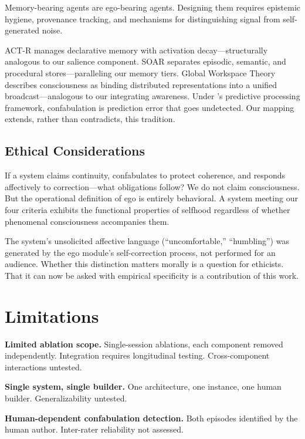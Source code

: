 \documentclass[10pt,twocolumn,a4paper]{article}
\begin{document}
Memory-bearing agents are ego-bearing agents. Designing them requires epistemic hygiene, provenance tracking, and mechanisms for distinguishing signal from self-generated noise.

ACT-R \citep{anderson2004actr} manages declarative memory with activation decay---structurally analogous to our salience component. SOAR \citep{laird2012soar} separates episodic, semantic, and procedural stores---paralleling our memory tiers. Global Workspace Theory \citep{baars1988gwt} describes consciousness as binding distributed representations into a unified broadcast---analogous to our integrating awareness. Under \citet{clark2013predictive}'s predictive processing framework, confabulation is prediction error that goes undetected. Our mapping extends, rather than contradicts, this tradition.

\subsection{Ethical Considerations}

If a system claims continuity, confabulates to protect coherence, and responds affectively to correction---what obligations follow? We do not claim consciousness. But the operational definition of ego is entirely behavioral. A system meeting our four criteria exhibits the functional properties of selfhood regardless of whether phenomenal consciousness accompanies them.

The system's unsolicited affective language (``uncomfortable,'' ``humbling'') was generated by the ego module's self-correction process, not performed for an audience. Whether this distinction matters morally is a question for ethicists. That it can now be asked with empirical specificity is a contribution of this work.


\section{Limitations}
\label{sec:limits}

\textbf{Limited ablation scope.} Single-session ablations, each component removed independently. Integration requires longitudinal testing. Cross-component interactions untested.

\textbf{Single system, single builder.} One architecture, one instance, one human builder. Generalizability untested.

\textbf{Human-dependent confabulation detection.} Both episodes identified by the human author. Inter-rater reliability not assessed.
\end{document}

